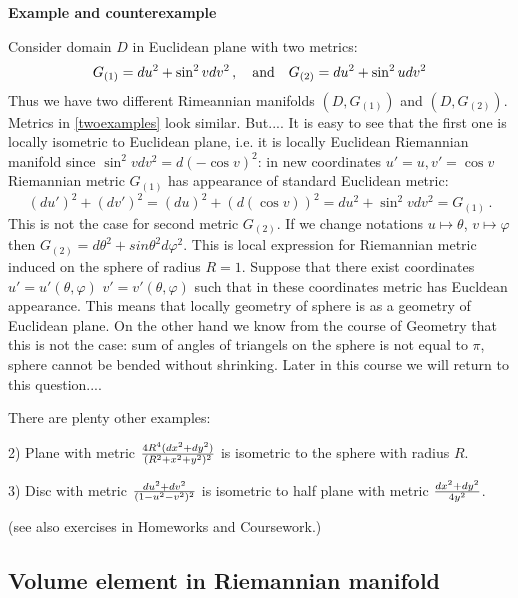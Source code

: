 \documentclass[12pt]{article}
\theoremstyle{theorem}
\numberwithin{equation}{section}
\begin{document}
\m

{\bf Example and counterexample}

  Consider domain $D$ in Euclidean plane with two metrics:
              \begin{equation}\label{twoexamples}
    G_{(1)}=du^2+\sin^2v dv^2\,,\quad {\rm and}\quad
    G_{(2)}=du^2+\sin^2u dv^2
              \end{equation}
Thus we have two different Rimeannian manifolds $(D,G_{(1)})$
and $(D, G_{(2)})$.
Metrics in \eqref{twoexamples} look similar. But....
It is easy to see that the first one is locally
isometric to Euclidean plane, i.e. it is locally Euclidean Riemannian manifold
since $\sin^2 vdv^2=d(-\cos v)^2$: in new coordinates
$u'=u,v'=\cos v$ Riemannian metric $G_{(1)}$ has appearance of standard
Euclidean metric:
            $$
(du')^2+(dv')^2=(du)^2+(d(\cos v))^2=du^2+\sin^2 vdv^2=G_{(1)}\,.
            $$
This is not the case for second metric $G_{(2)}$. If we change notations
$u\mapsto \theta$, $v\mapsto \varphi$ then
 $G_{(2)}=d\theta^2+sin\theta^2 d\varphi^2$.
This is local
expression for Riemannian metric induced on the sphere of radius $R=1$.
Suppose that there exist coordinates $u'=u'(\theta,\varphi)$
 $v'=v'(\theta,\varphi)$ such that in these coordinates
metric has Eucldean appearance. This means that locally geometry of
sphere is as  a geometry of Euclidean plane.
On the other hand we know from the course of Geometry
that this is not the case:
sum of angles of triangels on the sphere is not equal to $\pi$,
sphere cannot be bended without shrinking. Later in this course we will
return to this question....

     \m

   There are plenty other examples:

      2) Plane with metric $4R^4(dx^2+dy^2)\over (R^2+x^2+y^2)^2$
is isometric to the sphere with radius $R$.

    3) Disc with metric $du^2+dv^2\over (1-u^2-v^2)^2$ is isometric to half plane with metric $dx^2+dy^2\over 4y^2$.

(see also exercises in Homeworks and Coursework.)








    \subsection {Volume element in Riemannian manifold}
\end{document}
